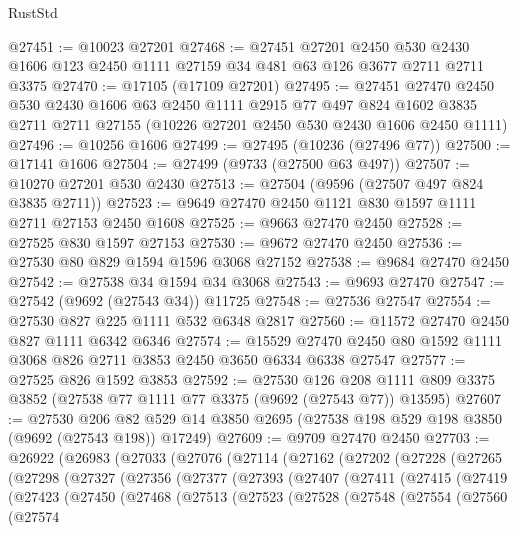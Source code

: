 \begin{lexlean}{RustStd}
\begin{coremodule}
{\begin{coremodule}
{{{{{{{{{{{{{{{{{{{{{{{{{{{{{{{{{{{{{{{{{{{{{{{{{{{{{{{@27451 := @10023 @27201
@27468 := @27451
    @27201
    @2450
    @530
    @2430
    @1606
    @123
    @2450
    @1111
    @27159
    @34
    @481
    @63
    @126
    @3677
    @2711
    @2711
    @3375
@27470 := @17105 (@17109 @27201)
@27495 := @27451
    @27470
    @2450
    @530
    @2430
    @1606
    @63
    @2450
    @1111
    @2915
    @77
    @497
    @824
    @1602
    @3835
    @2711
    @2711
    @27155
    (@10226 @27201 @2450 @530 @2430 @1606 @2450 @1111)
@27496 := @10256 @1606
@27499 := @27495 (@10236 (@27496 @77))
@27500 := @17141 @1606
@27504 := @27499 (@9733 (@27500 @63 @497))
@27507 := @10270 @27201 @530 @2430
@27513 := @27504 (@9596 (@27507 @497 @824 @3835 @2711))
@27523 := @9649 @27470 @2450 @1121 @830 @1597 @1111 @2711 @27153 @2450 @1608
@27525 := @9663 @27470 @2450
@27528 := @27525 @830 @1597 @27153
@27530 := @9672 @27470 @2450
@27536 := @27530 @80 @829 @1594 @1596 @3068 @27152
@27538 := @9684 @27470 @2450
@27542 := @27538 @34 @1594 @34 @3068
@27543 := @9693 @27470
@27547 := @27542 (@9692 (@27543 @34)) @11725
@27548 := @27536 @27547
@27554 := @27530 @827 @225 @1111 @532 @6348 @2817
@27560 := @11572 @27470 @2450 @827 @1111 @6342 @6346
@27574 := @15529 @27470 @2450 @80 @1592 @1111 @3068 @826 @2711 @3853 @2450 @3650 @6334 @6338 @27547
@27577 := @27525 @826 @1592 @3853
@27592 := @27530
    @126
    @208
    @1111
    @809
    @3375
    @3852
    (@27538 @77 @1111 @77 @3375 (@9692 (@27543 @77)) @13595)
@27607 := @27530
    @206
    @82
    @529
    @14
    @3850
    @2695
    (@27538 @198 @529 @198 @3850 (@9692 (@27543 @198)) @17249)
@27609 := @9709 @27470 @2450
@27703 := @26922
    (@26983
      (@27033
        (@27076
          (@27114
            (@27162
              (@27202
                (@27228
                  (@27265
                    (@27298
                      (@27327
                        (@27356
                          (@27377
                            (@27393
                              (@27407
                                (@27411
                                  (@27415
                                    (@27419
                                      (@27423
                                        (@27450
                                          (@27468
                                            (@27513
                                              (@27523
                                                (@27528
                                                  (@27548
                                                    (@27554
                                                      (@27560
                                                        (@27574
}}}}}}}}}}}}}}}}}}}}}}}}}}}}}}}}}}}}}}}}}}}}}}}}}}}}}}}
\end{coremodule}}
\end{coremodule}
\end{lexlean}
